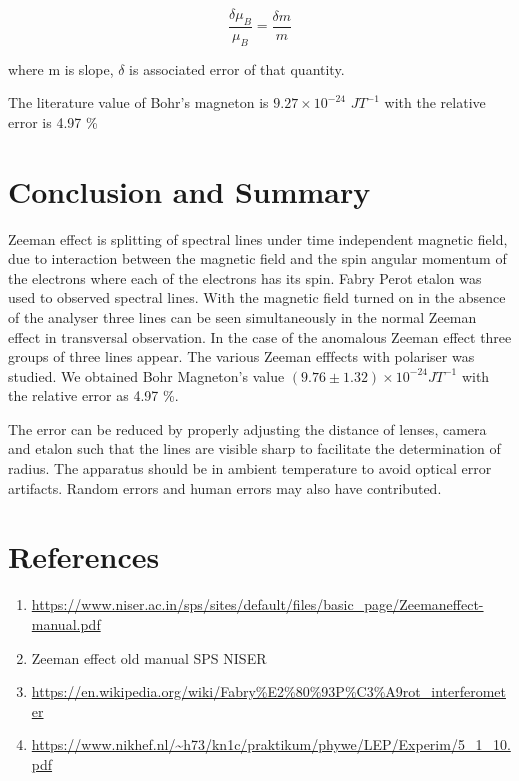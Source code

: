 \documentclass[a4paper, amsfonts, amssymb, amsmath, reprint, showkeys, nofootinbib, twoside]{revtex4-1}
\begin{document}
\begin{equation}
	\frac{\delta \mu_B}{\mu_B}=\frac{\delta m}{m}
\end{equation}

where m is slope, $\delta$ is associated error of that quantity. 

The literature value of Bohr's magneton is $9.27\times10^{-24} $ $JT^{-1}$ with the relative error is 4.97 \%

\section{Conclusion and Summary}
Zeeman effect is splitting of spectral lines under time independent magnetic field, due to interaction between the magnetic field and the spin angular momentum of the electrons where each of the electrons has its spin. Fabry Perot etalon was used to observed spectral lines. With the magnetic field turned on in the absence of the analyser three lines can be seen simultaneously in the normal Zeeman effect in transversal observation. In the case of the anomalous Zeeman effect three groups of three lines appear. The various Zeeman efffects with polariser was studied. We obtained Bohr Magneton's value $(9.76\pm1.32)\times10^{-24}  JT^{-1}$ with the relative error as  4.97 \%.  

The error can be reduced by properly adjusting the distance of lenses, camera and etalon such that the lines are visible sharp to facilitate the determination of radius. The apparatus should be in ambient temperature to avoid optical error artifacts.  Random errors and human errors may also have contributed. 

\section{References}
\begin{enumerate}
	\item {\url{https://www.niser.ac.in/sps/sites/default/files/basic_page/Zeemaneffect-manual.pdf}}
	\item {Zeeman effect old manual SPS NISER}
	\item {\url{https://en.wikipedia.org/wiki/Fabry%E2%80%93P%C3%A9rot_interferometer}}
	\item {\url{https://www.nikhef.nl/~h73/kn1c/praktikum/phywe/LEP/Experim/5_1_10.pdf}}
\end{enumerate}
\end{document}
